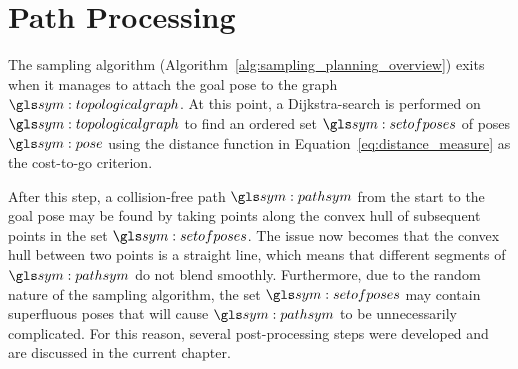 \chapter{Path Processing}%
\label{chap:path_processing}

	The sampling algorithm (Algorithm~\ref{alg:sampling_planning_overview})
	exits when it manages to attach the goal pose to the graph
	$\topologicalgraph$. At this point, a Dijkstra-search is performed on
	$\topologicalgraph$ to find an ordered set $\setofposes$ of poses $\pose$
	using the distance function in Equation~\ref{eq:distance_measure} as the
	cost-to-go criterion.

	After this step, a collision-free path $\pathsym$ from the start to the goal
	pose may be found by taking points along the convex hull of subsequent
	points in the set $\setofposes$. The issue now becomes that the convex hull
	between two points is a straight line, which means that different segments
	of $\pathsym$ do not blend smoothly. Furthermore, due to the random nature
	of the sampling algorithm, the set $\setofposes$ may contain superfluous
	poses that will cause $\pathsym$ to be unnecessarily complicated. For this
	reason, several post-processing steps were developed and are discussed in
	the current chapter.

	
	
	
